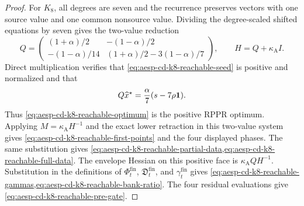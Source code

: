 \begin{proof}
For $K_8$, all degrees are seven and the recurrence preserves vectors with
one source value and one common nonsource value.  Dividing the
degree-scaled shifted equations by seven gives the two-value reduction
\begin{equation*}
 Q=\begin{pmatrix}
 (1+\alpha)/2&-(1-\alpha)/2\\
 -(1-\alpha)/14&(1+\alpha)/2-3(1-\alpha)/7
 \end{pmatrix},
 \qquad H=Q+\kappa_{\mathrm A}I.
\end{equation*}
Direct multiplication verifies that
\cref{eq:aesp-cd-k8-reachable-seed} is positive and normalized and that
\begin{equation*}
 Q\widehat x^\star
 =\frac\alpha7(s-7\rho\mathbf{1}).
\end{equation*}
Thus \cref{eq:aesp-cd-k8-reachable-optimum} is the positive RPPR optimum.
Applying $M=\kappa_{\mathrm A}H^{-1}$ and the exact lower retraction in this
two-value system gives
\cref{eq:aesp-cd-k8-reachable-first-points} and the four displayed phases.
The same substitution gives
\cref{eq:aesp-cd-k8-reachable-partial-data,eq:aesp-cd-k8-reachable-full-data}.
The envelope Hessian on this positive face is
$\kappa_{\mathrm A}QH^{-1}$.  Substitution in the definitions of
$\Phi_t^{\mathrm{fin}}$, $\mathfrak D_t^{\mathrm{fin}}$, and
$\gamma_t^{\mathrm{fin}}$ gives
\cref{eq:aesp-cd-k8-reachable-gammas,eq:aesp-cd-k8-reachable-bank-ratio}.
The four residual evaluations give
\cref{eq:aesp-cd-k8-reachable-pre-gate}.


\end{proof}

